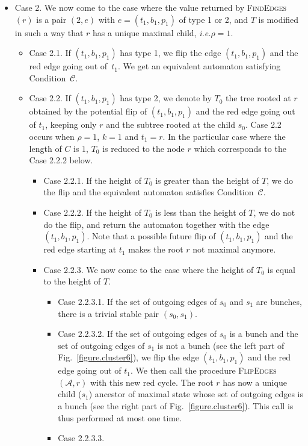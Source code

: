 \documentclass[11pt,a4paper]{article}
\def\A{\mathcal{A}}
\def\C{\mathscr{C}}
\def\T{{T}}
\newcommand{\ie}{{\itshape i.e.}\xspace }
\begin{document}
\begin{itemize}
\item Case 2. We now come to the case where the value returned by
  \textsc{FindEdges}$(r)$ is a pair $(2,e)$ with $e=(t_1,b_1,p_1)$ of
  type 1 or 2, and $\T$ is modified in such a way that 
 $r$ has a unique maximal child, \ie $\rho = 1$.
\begin{itemize}
\item Case 2.1.  If $(t_1,b_1,p_1)$ has type 1, we flip the edge
  $(t_1,b_1,p_1)$ and the red edge going out of~$t_1$. We get an
  equivalent automaton satisfying Condition~$\C$.
\item Case 2.2.  If $(t_1,b_1,p_1)$ has type 2, we denote by $\T_0$
  the tree rooted at $r$ obtained by the potential flip of
  $(t_1,b_1,p_1)$ and the red edge going out of $t_1$, keeping only
  $r$ and the subtree rooted at the child $s_0$.  Case 2.2 occurs
  when $\rho=1$, $k=1$ and $t_1=r$. In the particular case where the
  length of $C$ is $1$, $\T_0$ is reduced to the node $r$ which
  corresponds to the Case 2.2.2 below.
\begin{itemize}
\item Case 2.2.1.  If the height of $\T_0$ is greater than the height
  of $\T$, we do the flip and the equivalent automaton satisfies
  Condition~$\C$.  
\item Case 2.2.2.  If the height of $\T_0$ is less than the height of
  $\T$, we do not do the flip, and return the automaton together with
  the edge $(t_1,b_1,p_1)$. Note that a possible future flip of
  $(t_1,b_1,p_1)$ and the red edge starting at $t_1$ makes the root
  $r$ not maximal anymore.
\item Case 2.2.3.  
We now come to the case where the height
  of $\T_0$ is equal to the height of $\T$.  
\begin{itemize}
\item Case 2.2.3.1.  If the set of outgoing edges of $s_0$ and $s_1$
  are bunches, there is a trivial stable pair $(s_0,s_1)$.
\item Case 2.2.3.2.
If the set of outgoing edges of $s_0$ is a bunch and
  the set of outgoing edges of $s_1$ is not a bunch (see the left
  part of Fig.~\ref{figure.cluster6}), we flip the edge
  $(t_1,b_1,p_1)$ and the red edge going out of $t_1$.  We then call
  the procedure \textsc{FlipEdges}$(\A,r)$ with this new red
  cycle. The root $r$ has now a unique child ($s_1$) ancestor of
  maximal state whose set of outgoing edges is a bunch (see the right
  part of Fig.~\ref{figure.cluster6}).  This call is thus performed
  at most one time.  
\item Case 2.2.3.3.

\end{itemize}
\end{itemize}
\end{itemize}
\end{itemize}
\end{document}
